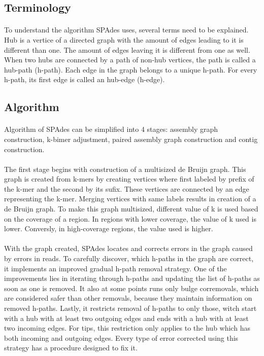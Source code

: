 \subsection{Terminology}
\paragraph*{}
To understand the algorithm SPAdes uses, several terms need to be explained. Hub is a vertice of a directed graph with the amount of edges leading to it is different than one. The amount of edges leaving it is different from one as well. When two hubs are connected by a path of non-hub vertices, the path is called a hub-path (h-path). Each edge in the graph belongs to a unique h-path. For every h-path, its first edge is called an hub-edge (h-edge).

\subsection{Algorithm}
\paragraph*{}
Algorithm of SPAdes can be simplified into 4 stages: assembly graph construction, k-bimer adjustment, paired assembly graph construction and contig construction. 
\paragraph*{}
The first stage begins with construction of a multisized de Bruijn graph. This graph is created from k-mers by creating vertices where first labeled by prefix of the k-mer and the second by its sufix. These vertices are connected by an edge representing the k-mer. Merging vertices with same labels results in creation of a de Bruijn graph. To make this graph multisized, different value of k is used based on the coverage of a region. In regions with lower coverage, the value of k used is lower. Conversly, in high-coverage regions, the value used is higher. 
\paragraph*{}
With the graph created, SPAdes locates and corrects errors in the graph caused by errors in reads. To carefully discover, which h-paths in the graph are correct, it implements an improved gradual h-path removal strategy. One of the improvements lies in iterating through h-paths and updating the list of h-paths as soon as one is removed. It also at some points runs only bulge corremovals, which are considered safer than other removals, because they maintain information on removed h-paths. Lastly, it restricts removal of h-paths to only those, witch start with a hub with at least two outgoing edges and ends with a hub with at least two incoming edges. For tips, this restriction only applies to the hub which has both incoming and outgoing edges. Every type of error corrected using this strategy has a procedure designed to fix it.
